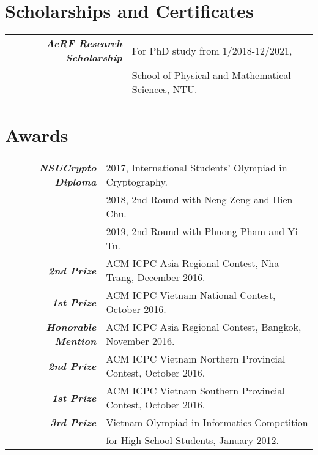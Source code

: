 \documentclass[a4paper, 11pt]{article}
\begin{document}
	
	\section{Scholarships and Certificates}	
	\begin{tabular}{rl}
		{\sl \textbf{AcRF Research Scholarship}} & For PhD study from 1/2018-12/2021, \\
		& School of Physical and Mathematical Sciences, NTU.\\
	\end{tabular}
	
	
	
	\section{Awards}
	\begin{tabular}{rl}
		{\sl \textbf{NSUCrypto Diploma}}& 2017, International Students' Olympiad in Cryptography.\\
		{}& 2018, 2nd Round with Neng Zeng and Hien Chu.\\
		{}& 2019, 2nd Round with Phuong Pham and Yi Tu.\\
		{\sl \textbf{2nd Prize}}& ACM ICPC Asia Regional Contest, Nha Trang, December 2016.\\
		{\sl \textbf{1st Prize}}& ACM ICPC Vietnam National Contest, October 2016.\\
		{\sl \textbf{Honorable Mention}}& ACM ICPC Asia Regional Contest, Bangkok, November 2016.\\
		{\sl \textbf{2nd Prize}}& ACM ICPC Vietnam Northern Provincial Contest, October 2016.\\
		{\sl \textbf{1st Prize}}& ACM ICPC Vietnam Southern Provincial Contest, October 2016.\\
		{\sl \textbf{3rd Prize}}& Vietnam Olympiad in Informatics Competition\\& for High School Students, January 2012.
	\end{tabular}
	
\end{document}
